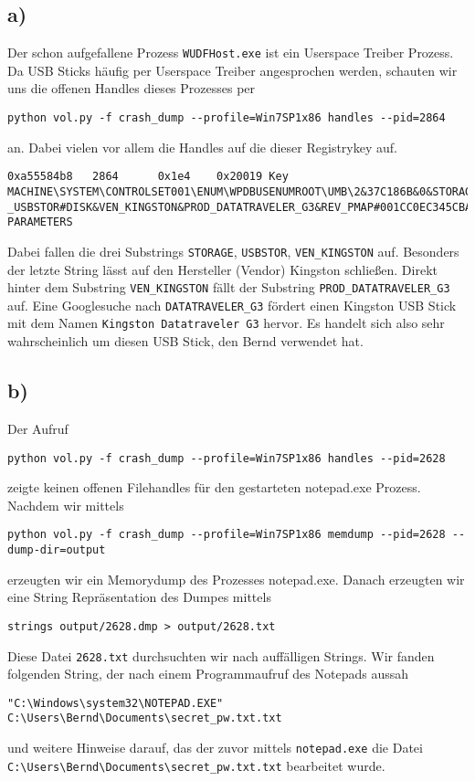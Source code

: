 \documentclass[10pt,a4paper]{article}
\begin{document}
\subsection*{a)}
Der schon aufgefallene Prozess \texttt{WUDFHost.exe} ist ein Userspace Treiber Prozess. Da USB Sticks häufig per Userspace Treiber angesprochen werden, schauten wir uns die offenen Handles dieses Prozesses per 
\begin{verbatim}
python vol.py -f crash_dump --profile=Win7SP1x86 handles --pid=2864
\end{verbatim}
an. Dabei vielen vor allem die Handles auf die dieser Registrykey auf.
\begin{lstlisting}
0xa55584b8   2864      0x1e4    0x20019 Key              MACHINE\SYSTEM\CONTROLSET001\ENUM\WPDBUSENUMROOT\UMB\2&37C186B&0&STORAGE#VOLUME#_??_USBSTOR#DISK&VEN_KINGSTON&PROD_DATATRAVELER_G3&REV_PMAP#001CC0EC345CBA9175C40135&0#\DEVICE PARAMETERS
\end{lstlisting}
Dabei fallen die drei Substrings  \texttt{STORAGE}, \texttt{USBSTOR}, \texttt{VEN\_KINGSTON} auf. Besonders der letzte String lässt auf den Hersteller (Vendor) Kingston schließen. Direkt hinter dem Substring \texttt{VEN\_KINGSTON} fällt der Substring \texttt{PROD\_DATATRAVELER\_G3} auf. Eine Googlesuche nach \texttt{DATATRAVELER\_G3} fördert einen Kingston USB Stick mit dem Namen \texttt{Kingston Datatraveler G3} hervor. Es handelt sich also sehr wahrscheinlich um diesen USB Stick, den Bernd verwendet hat.

\subsection*{b)}

Der Aufruf
\begin{verbatim}
python vol.py -f crash_dump --profile=Win7SP1x86 handles --pid=2628
\end{verbatim}
zeigte keinen offenen Filehandles für den gestarteten notepad.exe Prozess.
Nachdem wir mittels
\begin{verbatim}
python vol.py -f crash_dump --profile=Win7SP1x86 memdump --pid=2628 --dump-dir=output
\end{verbatim}
erzeugten wir ein Memorydump des Prozesses notepad.exe. 
Danach erzeugten wir eine String Repräsentation des Dumpes mittels
\begin{verbatim}
strings output/2628.dmp > output/2628.txt
\end{verbatim}
Diese Datei \texttt{2628.txt} durchsuchten wir nach auffälligen Strings. Wir fanden folgenden String, der nach einem Programmaufruf des Notepads aussah 
\begin{verbatim}
"C:\Windows\system32\NOTEPAD.EXE" C:\Users\Bernd\Documents\secret_pw.txt.txt
\end{verbatim}
und weitere Hinweise darauf, das der zuvor mittels \texttt{notepad.exe} die Datei \\\texttt{C:\textbackslash Users\textbackslash Bernd\textbackslash Documents\textbackslash secret\_pw.txt.txt} bearbeitet wurde.
\end{document}
